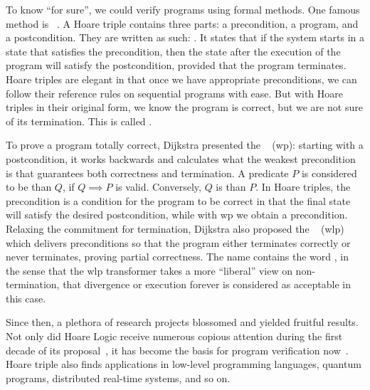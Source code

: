 To know ``for sure'', we could verify programs using formal methods. 
One famous method is ~\cite{hoare69}. 
A Hoare triple contains three parts: a precondition, a program, and a postcondition. 
They are written as such: .
It states that if the system starts in a state that satisfies the precondition, then the state after the execution of the program will satisfy the postcondition, provided that the program terminates.
Hoare triples are elegant in that once we have appropriate preconditions, we can follow their reference rules on sequential programs with ease. 
But with Hoare triples in their original form, we know the program is correct, but we are not sure of its termination. 
This is called . 

To prove a program totally correct, Dijkstra presented the ~\cite{dijkstra75} (wp): starting with a postcondition, it works backwards and calculates what the weakest precondition is that guarantees both correctness and termination. 
A predicate $P$ is considered to be  than $Q$, if $Q\implies P$ is valid. 
Conversely, $Q$ is  than $P$. 
In Hoare triples, the precondition is a  condition for the program to be correct in that the final state will satisfy the desired postcondition, while with wp we obtain a  precondition. 
Relaxing the commitment for termination, Dijkstra also proposed the ~\cite{dijkstra90} (wlp) which delivers preconditions so that the program either terminates correctly or never terminates, proving partial correctness. 
The name contains the word , in the sense that the wlp transformer takes a more ``liberal'' view on non-termination, that divergence or execution forever is considered as acceptable in this case. 

Since then, a plethora of research projects blossomed and yielded fruitful results. 
Not only did Hoare Logic receive numerous copious attention during the first decade of its proposal~\cite{apt81}, it has become the basis for program verification now~\cite{gordon2010ForwardHoare}. 
Hoare triple also finds applications in low-level programming languages, quantum programs, distributed real-time systems, and so on. 


